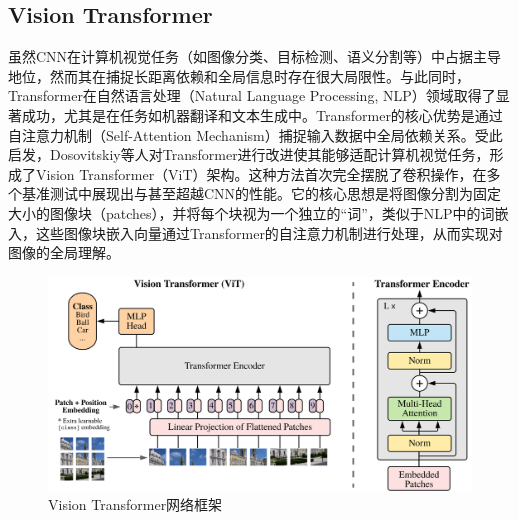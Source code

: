 \documentclass[lang=chs, degree=master, blindreview=false, adobe=false]{yanputhesis}
\begin{document}
\subsection{Vision Transformer}
虽然CNN在计算机视觉任务（如图像分类、目标检测、语义分割等）中占据主导地位，然而其在捕捉长距离依赖和全局信息时存在很大局限性。与此同时，Transformer在自然语言处理（Natural Language Processing, NLP）领域取得了显著成功，尤其是在任务如机器翻译和文本生成中。Transformer的核心优势是通过自注意力机制（Self-Attention Mechanism）捕捉输入数据中全局依赖关系。受此启发，Dosovitskiy等人\cite{dosovitskiy2020vit}对Transformer进行改进使其能够适配计算机视觉任务，形成了Vision Transformer（ViT）架构。这种方法首次完全摆脱了卷积操作，在多个基准测试中展现出与甚至超越CNN的性能。它的核心思想是将图像分割为固定大小的图像块（patches），并将每个块视为一个独立的“词”，类似于NLP中的词嵌入，这些图像块嵌入向量通过Transformer的自注意力机制进行处理，从而实现对图像的全局理解。
\begin{figure}[htb]
  \centering
  \includegraphics[scale=0.55]{images/ViT.png}
  \caption{
    Vision Transformer网络框架\cite{dosovitskiy2020vit}
  }
  \label{fig:ViT}
\end{figure}
\end{document}

